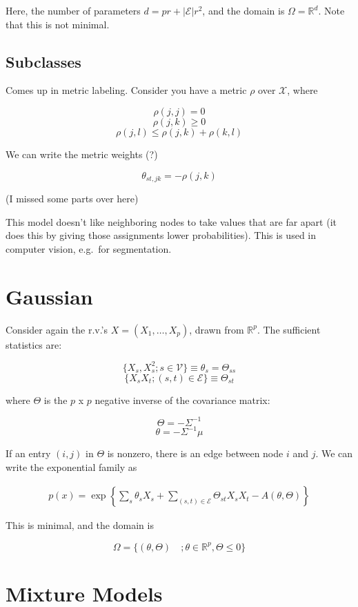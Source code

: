 \documentclass[11pt]{article}
\newcommand{\X}{\mathcal{X}}
\newcommand{\V}{\mathcal{V}}
\newcommand{\e}{\mathcal{E}}
\newcommand{\R}{\mathbb{R}}
\newcommand{\inv}{^{-1}}
\begin{document}
Here, the number of parameters $d = pr + |\e|r^2$, and the domain is $\Omega = \R^d$. Note that this is not minimal. 

\subsection{Subclasses}

Comes up in metric labeling. Consider you have a metric $\rho$ over $\X$, where

$$ \rho(j, j) = 0 $$
$$ \rho (j, k) \geq 0 $$
$$ \rho (j, l) \leq \rho(j,k) + \rho(k,l) $$

We can write the metric weights (?)

$$ \theta_{st, jk} = -\rho(j,k) $$

(I missed some parts over here)

This model doesn't like neighboring nodes to take values that are far apart (it does this by giving those assignments lower probabilities). This is used in computer vision, e.g.~for segmentation. 

\section{Gaussian}

Consider again the r.v.'s $X = (X_1, \ldots, X_p)$, drawn from $\R^p$. The sufficient statistics are:

$$ \{X_s, X_s^2 ; s\in \V\} \equiv \theta_s = \Theta_{ss}$$
$$ \{X_sX_t ; (s, t) \in \e\} \equiv \Theta_{st} $$

where $\Theta$ is the $p$ x $p$ negative inverse of the covariance matrix:

$$ \Theta = - \Sigma\inv $$
$$ \theta = -\Sigma\inv\mu $$

If an entry $(i,j)$ in $\Theta$ is nonzero, there is an edge between node $i$ and $j$. We can write the exponential family as

\begin{align}
p(x) = \exp \left \{ \sum_s \theta_s X_s + \sum_{(s,t) \in \e} \Theta_{st}X_sX_t - A(\theta, \Theta) \right \}
\end{align}

This is minimal, and the domain is

$$ \Omega = \{ (\theta, \Theta) \quad ; \theta \in \R^p, \Theta \leq 0\} $$

\section{Mixture Models}
\end{document}
